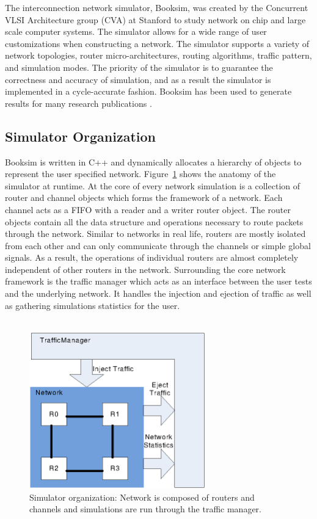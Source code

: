 
The interconnection network simulator, Booksim, was created by the Concurrent VLSI Architecture group (CVA) at Stanford to study network on chip and large scale computer systems. The simulator allows for a wide range of user customizations when constructing a network. The simulator supports a variety of network topologies, router micro-architectures, routing algorithms, traffic pattern, and simulation modes. The priority of the simulator is  to guarantee the correctness and accuracy of simulation, and as a result the simulator is implemented in a cycle-accurate fashion. Booksim has been used to generate results for many research publications \cite{cdragon,KimISCA07,PPIN}. 
\subsection{Simulator Organization}
Booksim is written in C++ and dynamically allocates a hierarchy of objects to represent the user specified network. Figure~\ref{fig:simulator} shows the anatomy of the simulator at runtime. At the core of every network simulation is a collection of router and channel objects which forms the framework of a network. Each channel acts as a FIFO with a reader and a writer router object. The router objects contain all the data structure and operations necessary to route packets through the network. Similar to networks in real life, routers are mostly isolated from each other and can only communicate through the channels or simple global signals. As a result, the operations of individual routers are almost completely independent of other routers in the network. Surrounding the core network framework is the traffic manager which acts as an interface between the user tests and the underlying network. It handles the injection and ejection of traffic as well as gathering simulations statistics for the user. \\
~\\
\begin{figure}[h]
\centering
\includegraphics[width=3in]{simulator.eps}
\caption{Simulator organization: Network is composed of routers and channels and simulations are run through the traffic manager. }
\label{fig:simulator}
\end{figure}
